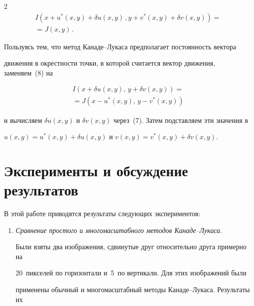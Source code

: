 \begin{multicols}{2}
     \begin{multline}


     I(x+u^*(x,y)+\delta u(x,y)\,,y+v^*(x,y)+\delta v(x,y)) ={}\\


     {}= J(x,y)\,.


     \label{e9nas}


     \end{multline}





     Пользуясь тем, что метод Канаде--Лукаса предполагает постоянность вектора


движения в окрестности точки, в которой считается вектор движения, заменяем~(8) на


     \begin{multline*}


     I(x+\delta u(x,y),\,y+\delta v(x,y)) = {}\\


     {}=J(x-u^*(x,y),\,y-v^*(x,y))




     \end{multline*}


и вычисляем $\delta u(x,y)$ и $\delta v(x,y)$ через~(7). Затем под\-став\-ля\-ем эти значения в


$u(x,y) =u^*(x,y)+\delta u(x,y)$ и $v(x,y) = v^*(x,y)+\delta v(x,y)$.





     \section{Эксперименты и обсуждение результатов}





     В этой работе приводятся результаты следующих экспериментов:


     \begin{enumerate}[1.]


     \item \textit{Сравнение простого и многомасштабного методов Канаде--Лукаса}.


Были взяты два изображения, сдвинутые друг относительно друга примерно на


20~пикселей по горизонтали и~5~по вертикали. Для этих изображений были


применены обычный и многомасштабный методы Канаде--Лукаса. Результаты их



\end{enumerate}
\end{multicols}
